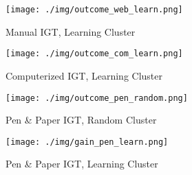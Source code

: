 \begin{figure*}
\caption{Subset of Clusters}
\label{fig:learning}
\centering
        \begin{subfigure}[b]{0.4\textwidth}
                \centering
                \texttt{[image: ./img/outcome\_web\_learn.png]}
                \caption{\tiny{Manual IGT, Learning Cluster}}
                \label{a}
        \end{subfigure}
        \begin{subfigure}[b]{0.4\textwidth}
                \centering
                \texttt{[image: ./img/outcome\_com\_learn.png]}
                \caption{\tiny{Computerized IGT, Learning Cluster}}
                \label{b}
        \end{subfigure}
        \begin{subfigure}[b]{0.4\textwidth}
                \centering
                \texttt{[image: ./img/outcome\_pen\_random.png]}
                \caption{\tiny{Pen \& Paper IGT, Random Cluster}}
                \label{c}
        \end{subfigure}
        \begin{subfigure}[b]{0.4\textwidth}
                \centering
                \texttt{[image: ./img/gain\_pen\_learn.png]}
                \caption{\tiny{Pen \& Paper IGT, Learning Cluster}}
                \label{d}
        \end{subfigure}
\end{figure*}
